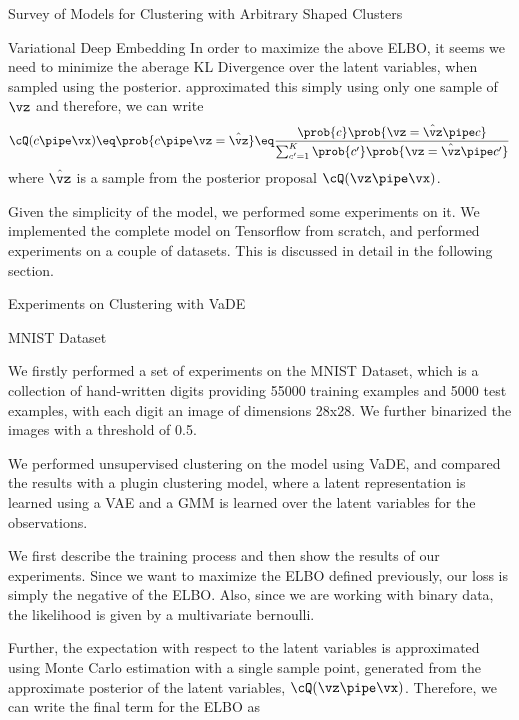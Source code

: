\documentclass{article}
\begin{document}
\begin{psection}{Survey of Models for Clustering with Arbitrary Shaped Clusters}
\begin{psubsection}{Variational Deep Embedding}
		In order to maximize the above ELBO, it seems we need to minimize the aberage KL Divergence over the latent variables, when sampled using the posterior.  approximated this simply using only one sample of $\vz$ and therefore, we can write 
		\begin{align*}
			\cQ(c \pipe \vx) \eq \prob{c \pipe \vz = \hat{\vz}} \eq \frac{\prob{c} \prob{\vz = \hat{\vz} \pipe c}}{\sum_{c' = 1}^{K} \prob{c'} \prob{\vz = \hat{\vz} \pipe c'}}
		\end{align*}
		where $\hat{\vz}$ is a sample from the posterior proposal $\cQ(\vz \pipe \vx)$.

		Given the simplicity of the model, we performed some experiments on it. We implemented the complete model on Tensorflow from scratch, and performed experiments on a couple of datasets. This is discussed in detail in the following section.
	\end{psubsection}

	\begin{psubsection}{Experiments on Clustering with VaDE}

		\begin{pssubsection}{MNIST Dataset}

			We firstly performed a set of experiments on the MNIST Dataset, which is a collection of hand-written digits providing 55000 training examples and 5000 test examples, with each digit an image of dimensions 28x28. We further binarized the images with a threshold of 0.5.

			We performed unsupervised clustering on the model using VaDE, and compared the results with a plugin clustering model, where a latent representation is learned using a VAE and a GMM is learned over the latent variables for the observations.

			We first describe the training process and then show the results of our experiments. Since we want to maximize the ELBO defined previously, our loss is simply the negative of the ELBO. Also, since we are working with binary data, the likelihood is given by a multivariate bernoulli.

			Further, the expectation with respect to the latent variables is approximated using Monte Carlo estimation with a single sample point, generated from the approximate posterior of the latent variables, $\cQ(\vz \pipe \vx)$. Therefore, we can write the final term for the ELBO as


\end{pssubsection}
\end{psubsection}
\end{psection}
\end{document}
